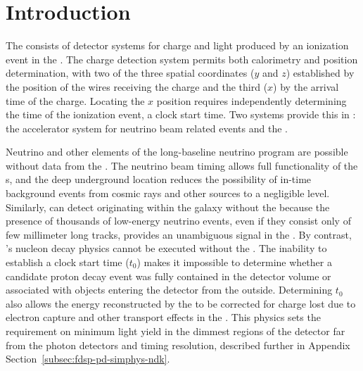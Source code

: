\newcommand{\tzero}{\ensuremath{t_0}\xspace}

\section{Introduction} %
\label{sec:fdsp-pd-intro}

The   consists of detector systems for charge and light produced by an ionization event in the .  The charge detection system permits both calorimetry and position determination, with two of the three spatial coordinates ($y$ and $z$)  established by the position of the  wires receiving the charge and the third ($x$) by the arrival time of the charge.  Locating the $x$ position requires independently determining the time of the ionization event, a clock start time.  Two systems provide this in :  the  accelerator system for neutrino beam related events and the .  

Neutrino  and other elements of the  long-baseline neutrino program are possible without data from the .  The neutrino beam timing allows full functionality of the s, and the deep underground location reduces the possibility of in-time background events from cosmic rays and other sources to a negligible level.  
Similarly,  can detect  originating within the galaxy without the  because the presence of thousands of low-energy neutrino events, even if they consist only of few millimeter long tracks, provides an unambiguous signal in the .
By contrast, 's nucleon decay physics cannot be executed without the .  The inability to establish a clock start time (\tzero) makes it impossible to determine whether a candidate proton decay event was fully contained in the detector volume or associated with objects entering the detector from the outside.  Determining \tzero also allows the energy reconstructed by the  to be corrected for charge lost due to electron capture and other transport effects in the . This physics sets the requirement on minimum light yield in the dimmest regions of the detector far from the photon detectors %
and timing resolution, %
described further in Appendix Section~\ref{subsec:fdsp-pd-simphys-ndk}.


